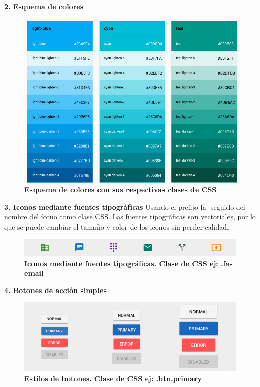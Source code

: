 \textbf{2. Esquema de colores}
\begin{figure}[h]
    \includegraphics[width=12cm]{Img/UX/guia0.jpg}
    \centering
    \caption{\textbf{ \footnotesize{Esquema de colores con sus respectivas clases de CSS}}}
\end{figure}


\textbf{3. Iconos mediante fuentes tipográficas}
    Usando el prefijo fa- seguido del nombre del ícono como clase CSS. Las fuentes tipográficas son vectoriales, por lo que se puede cambiar el tamaño y color de los iconos sin perder calidad.
    \begin{figure}[h]
    \includegraphics[width=11cm]{Img/UX/guia3.jpg}
    \centering
    \caption{\textbf{ \footnotesize{Iconos mediante fuentes tipográficas. Clase de CSS ej: .fa-email}}}
   
    \end{figure}
    
 
\textbf{4. Botones de acción simples}
    \begin{figure}[h]
    \includegraphics[width=11cm]{Img/UX/guia2.jpg}
    \centering
    \caption{\textbf{ \footnotesize{Estilos de botones. Clase de CSS ej: .btn.primary}}}
    \end{figure}
    

